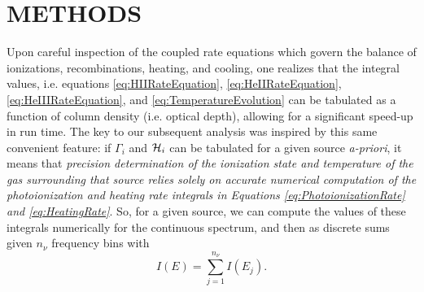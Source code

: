 \documentclass[preprint2]{aastex}              %
\begin{document}
\section{METHODS} \label{sec:Methods}
Upon careful inspection of the coupled rate equations which govern the balance
of ionizations, recombinations, heating, and cooling, one realizes that the
integral values, i.e. equations \ref{eq:HIIRateEquation},
\ref{eq:HeIIRateEquation}, \ref{eq:HeIIIRateEquation}, and
\ref{eq:TemperatureEvolution} can be tabulated as a function of column density
(i.e. optical depth), allowing for a significant speed-up in run time. The key
to our subsequent analysis was inspired by this same convenient feature: if
$\Gamma_i$ and $\mathcal{H}_i$ can be tabulated for a given source
\textit{a-priori}, it means that \textit{precision determination of the
ionization state and temperature of the gas surrounding that source relies
solely on accurate numerical computation of the photoionization and heating
rate integrals in Equations \ref{eq:PhotoionizationRate} and
\ref{eq:HeatingRate}}. So, for a given source, we can compute the values of
these integrals numerically for the continuous spectrum, and then as discrete
sums given $n_{\nu}$ frequency bins with
\begin{equation}
    I(E) = \sum_{j=1}^{n_{\nu}} I(E_j) .
\end{equation}

\end{document}
